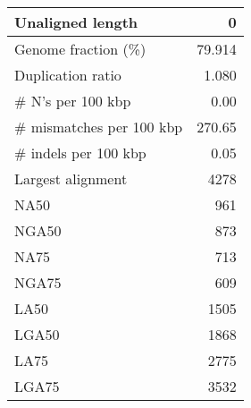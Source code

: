 \documentclass[12pt,a4paper]{article}
\begin{document}
\begin{table}[ht]
\begin{center}
\begin{tabular}{|l*{1}{|r}|}
Unaligned length & 0 \\ \hline
Genome fraction (\%) & 79.914 \\ \hline
Duplication ratio & 1.080 \\ \hline
\# N's per 100 kbp & 0.00 \\ \hline
\# mismatches per 100 kbp & 270.65 \\ \hline
\# indels per 100 kbp & 0.05 \\ \hline
Largest alignment & 4278 \\ \hline
NA50 & 961 \\ \hline
NGA50 & 873 \\ \hline
NA75 & 713 \\ \hline
NGA75 & 609 \\ \hline
LA50 & 1505 \\ \hline
LGA50 & 1868 \\ \hline
LA75 & 2775 \\ \hline
LGA75 & 3532 \\ \hline
\end{tabular}
\end{center}
\end{table}
\end{document}
